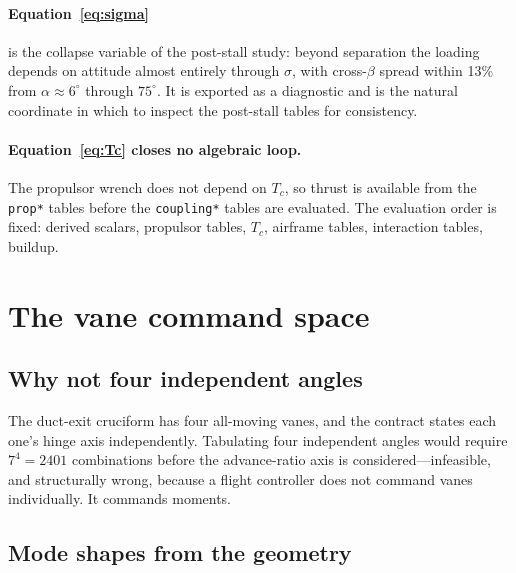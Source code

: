 \documentclass[11pt,a4paper]{article}
\newcommand{\varid}[1]{\texttt{\small #1}}
\newcommand{\dg}{^\circ}
\begin{document}
\paragraph{Equation~\eqref{eq:sigma}} is the collapse variable of the
post-stall study: beyond separation the loading depends on attitude
almost entirely through $\sigma$, with cross-$\beta$ spread within 13\%
from $\alpha \approx 6\dg$ through $75\dg$. It is exported as a
diagnostic and is the natural coordinate in which to inspect the
post-stall tables for consistency.

\paragraph{Equation~\eqref{eq:Tc} closes no algebraic loop.} The
propulsor wrench does not depend on $T_c$, so thrust is available from
the \varid{prop*} tables before the \varid{coupling*} tables are
evaluated. The evaluation order is fixed: derived scalars, propulsor
tables, $T_c$, airframe tables, interaction tables, buildup.

\section{The vane command space}
\label{sec:vanes}

\subsection{Why not four independent angles}

The duct-exit cruciform has four all-moving vanes, and the contract
states each one's hinge axis independently. Tabulating four independent
angles would require $7^4 = 2401$ combinations before the advance-ratio
axis is considered---infeasible, and structurally wrong, because a flight
controller does not command vanes individually. It commands moments.

\subsection{Mode shapes from the geometry}
\end{document}
